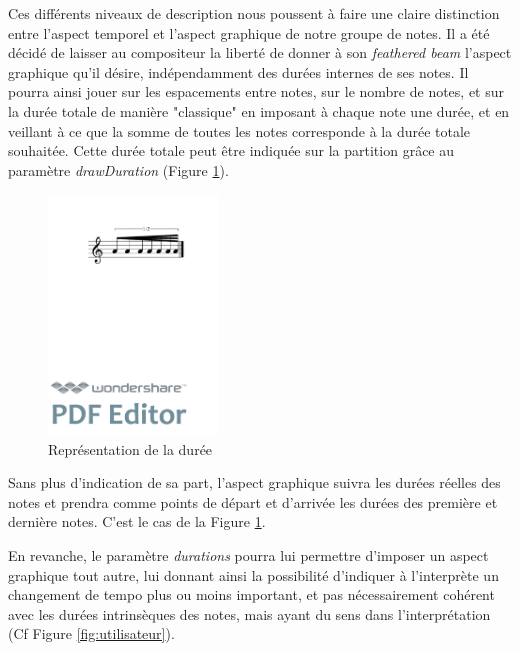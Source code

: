 \documentclass{article}
\newenvironment{gmncode}	{\vspace{-2mm}\small\verbatim}{\endverbatim\vspace{-2mm}}
\begin{document}
Ces différents niveaux de description nous poussent à faire une claire distinction entre l'aspect temporel et l'aspect graphique de notre groupe de notes.  Il a été décidé de laisser au compositeur la liberté de donner à son \emph{feathered beam} l'aspect graphique qu'il désire, indépendamment des durées internes de ses notes. Il pourra ainsi jouer sur les espacements entre notes, sur le nombre de notes, et sur la durée totale de manière "classique" en imposant à chaque note une durée, et en veillant à ce que la somme de toutes les notes corresponde à la durée totale souhaitée. Cette durée totale peut être indiquée sur la partition grâce au paramètre \emph{drawDuration} (Figure \ref{fig:fbeamduree}).

\begin{figure}[h]
\centering
\begin{gmncode}
[ 
  \fBeam<drawDuration="true">
  ( a/8 a a/16 a a a/32 a ) 
]
\end{gmncode}
\includegraphics[width=45mm]{img/fbeamduree.pdf}
\caption{Représentation de la durée}
\label{fig:fbeamduree}
\end{figure}

Sans plus d'indication de sa part, l'aspect graphique suivra les durées réelles des notes et prendra comme points de départ et d'arrivée les durées des première et dernière notes.  C'est le cas de la Figure \ref{fig:fbeamduree}.

En revanche, le paramètre \emph{durations} pourra lui permettre d'imposer un aspect graphique tout autre, lui donnant ainsi la possibilité d'indiquer à l'interprète un changement de tempo plus ou moins important, et pas nécessairement cohérent avec les durées intrinsèques des notes, mais ayant du sens dans l'interprétation (Cf Figure \ref{fig:utilisateur}).
\end{document}
